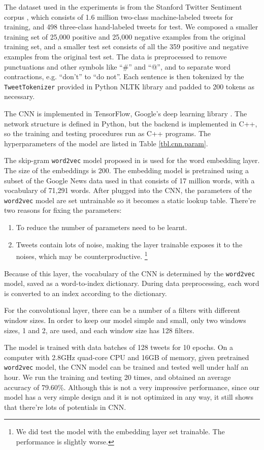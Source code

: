 The dataset used in the experiments is from the Stanford Twitter Sentiment corpus \cite{go2009}, which consists of 1.6 million two-class machine-labeled tweets for training, and 498 three-class hand-labeled tweets for test. We composed a smaller training set of 25,000 positive and 25,000 negative examples from the original training set, and a smaller test set consists of all the 359 positive and negative examples from the original test set. The data is preprocessed to remove punctuations and other symbols like ``\#'' and ``@'', and to separate word contractions, e.g. ``don't'' to ``do not''. Each sentence is then tokenized by the {\tt TweetTokenizer} provided in Python NLTK \cite{bird2006} library and padded to 200 tokens as necessary. 

The CNN is implemented in TensorFlow, Google's deep learning library \cite{abadi2016}. The network structure is defined in Python, but the backend is implemented in C++, so the training and testing procedures run as C++ programs. The hyperparameters of the model are listed in Table \ref{tbl.cnn.param}. 

The skip-gram {\tt word2vec} model proposed in \cite{mikolov2013} is used for the word embedding layer. The size of the embeddings is 200. The embedding model is pretrained using a subset of the Google News data used in \cite{mikolov2013} that consists of 17 million words, with a vocabulary of 71,291 words. After plugged into the CNN, the parameters of the {\tt word2vec} model are set untrainable so it becomes a static lookup table. There're two reasons for fixing the parameters:
\begin{enumerate}
\item To reduce the number of parameters need to be learnt.
\item Tweets contain lots of noise, making the layer trainable exposes it to the noises, which may be counterproductive. \footnote{We did test the model with the embedding layer set trainable. The performance is slightly worse.}
\end{enumerate}
Because of this layer, the vocabulary of the CNN is determined by the {\tt word2vec} model, saved as a word-to-index dictionary. During data preprocessing, each word is converted to an index according to the dictionary. 

For the convolutional layer, there can be a number of a filters with different window sizes. In order to keep our model simple and small, only two windows sizes, 1 and 2, are used, and each window size has 128 filters. 

The model is trained with data batches of 128 tweets for 10 epochs. On a computer with 2.8GHz quad-core CPU and 16GB of memory, given pretrained {\tt word2vec} model, the CNN model can be trained and tested well under half an hour. We run the training and testing 20 times, and obtained an average accuracy of 79.60\%. Although this is not a very impressive performance, since our model has a very simple design and it is not optimized in any way, it still shows that there're lots of potentials in CNN.